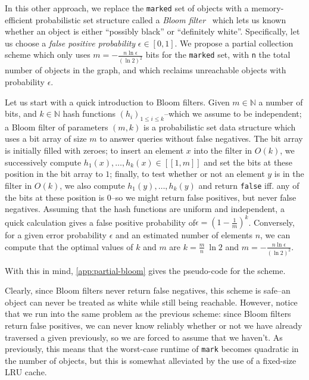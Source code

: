 In this other approach, we replace the \texttt{marked} set of objects with a memory-efficient probabilistic set structure called a \emph{Bloom filter}~\cite{bloom70} which lets us known whether an object is either ``possibly black'' or ``definitely white''. Specifically, let us choose a \emph{false positive probability} \(\epsilon \in [0, 1]\). We propose a partial collection scheme which only uses \(m = -\frac{n\ln{\epsilon}}{(\ln{2})^2}\) bits for the \texttt{marked} set, with \texttt{n} the total number of objects in the graph, and which reclaims unreachable objects with probability \(\epsilon\).

\bigskip
Let us start with a quick introduction to Bloom filters. Given \(m \in \mathbb{N}\) a number of bits, and \(k \in \mathbb{N}\) hash functions \((h_i)_{1 \leq i \leq k}\)--which we assume to be independent; a Bloom filter of parameters \((m, k)\) is a probabilistic set data structure which uses a bit array of size \(m\) to answer queries without false negatives. The bit array is initially filled with zeroes; to insert an element \(x\) into the filter in \(O(k)\), we successively compute \(h_1(x), \dots, h_k(x) \in [[1, m]]\) and set the bits at these position in the bit array to \(1\); finally, to test whether or not an element \(y\) is in the filter in \(O(k)\), we also compute \(h_1(y), \dots, h_k(y)\) and return \texttt{false} iff. any of the bits at these position is \(0\)--so we might return false positives, but never false negatives. Assuming that the hash functions are uniform and independent, a quick calculation gives a false positive probability of\(\epsilon = (1 - \frac{1}{m})^k\). Conversely, for a given error probability \(\epsilon\) and an estimated number of elements \(n\), we can compute that the optimal values of \(k\) and \(m\) are \(k = \frac{m}{n} \ \ln{2}\) and \(m = -\frac{n \ln{\epsilon}}{(\ln{2})^2}\).

With this in mind, \cref{app:partial-bloom} gives the pseudo-code for the scheme.

Clearly, since Bloom filters never return false negatives, this scheme is safe--an object can never be treated as white while still being reachable. However, notice that we run into the same problem as the previous scheme: since Bloom filters return false positives, we can never know reliably whether or not we have already traversed a given previously, so we are forced to assume that we haven't. As previously, this means that the worst-case runtime of \texttt{mark} becomes quadratic in the number of objects, but this is somewhat alleviated by the use of a fixed-size LRU cache.

